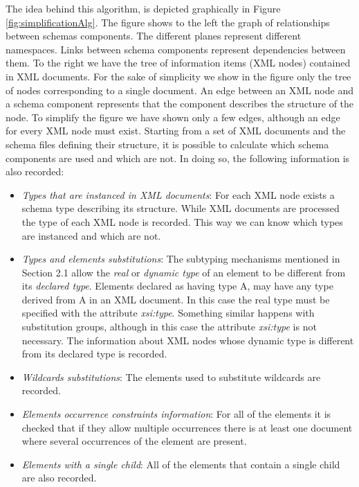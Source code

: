 \documentclass{sig-alternate}
\begin{document}
The idea behind this algorithm, is depicted graphically in Figure \ref{fig:simplificationAlg}. 
The figure shows to the left the graph of relationships between schemas components. 
The different planes represent different namespaces. Links between schema components represent dependencies between them. 
To the right we have the tree of information items (XML nodes) contained in XML documents.
For the sake of simplicity we show in the figure only the tree of nodes corresponding to a single document. 
An edge between an XML node and a schema component represents that the component describes the structure of the node. 
To simplify the figure we have shown only a few edges, although an edge for every XML node must exist.  
Starting from a set of XML documents and the schema files defining their structure, it is possible to calculate which schema components are used and which are not. 
In doing so, the following information is also recorded:

\begin{itemize}
\item \textit{Types that are instanced in XML documents}: For each XML node exists a schema type describing its structure. While XML documents are processed the type of each XML node is recorded. This way we can know which types are instanced and which are not.
\item \textit{Types and elements substitutions}: The subtyping mechanisms mentioned in Section 2.1 allow  the \textit{real} or \textit{dynamic type} of an element to be different from its \textit{declared type}. Elements declared as having type A, may have any type derived from A in an XML document. In this case the real type must be specified with the attribute \textit{xsi:type}. Something similar happens with substitution groups, although in this case the attribute \textit{xsi:type} is not necessary. The information about XML nodes whose dynamic type is different from its declared type is recorded.  
\item \textit{Wildcards substitutions}: The elements used to substitute wildcards are recorded. 
\item \textit{Elements occurrence constraints information}: For all of the elements it is checked that if they allow multiple occurrences there is at least one document where several occurrences of the element are present.
\item \textit{Elements with a single child}: All of the elements that contain a single child  are also recorded.
\end{itemize}
\end{document}
